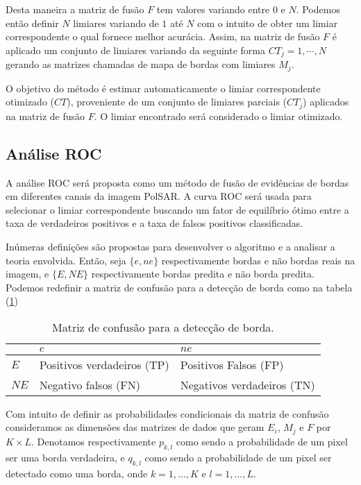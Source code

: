 Desta maneira a matriz de fusão $F$ tem valores variando entre $0$ e $N$. Podemos então definir $N$ limiares variando de $1$ até $N$ com o intuito de obter um limiar correspondente o qual fornece melhor acurácia. Assim, na matriz de fusão $F$ é aplicado um conjunto de limiares variando da seguinte forma  $CT_j=1,\cdots,N$ gerando as matrizes chamadas de mapa de bordas com limiares $M_j$.

O objetivo do método é estimar automaticamente o limiar correspondente otimizado ($CT$),  proveniente de um conjunto de limiares parciais ($CT_j$) aplicados na matriz de fusão $F$. O limiar encontrado será considerado o limiar otimizado.  

\subsection{Análise ROC}
	A análise ROC será proposta como um método de fusão de evidências de bordas em diferentes canais da imagem PolSAR. A curva ROC será usada para selecionar o limiar correspondente buscando um fator de equilíbrio ótimo entre a taxa de verdadeiros positivos e a taxa de falsos positivos classificadas.

 Inúmeras  definições são propostas para desenvolver o algoritmo e a analisar a teoria envolvida. Então, seja $\{e, ne\}$ respectivamente bordas e não bordas reais na imagem, e $\{E, NE\}$ respectivamente bordas predita e não borda predita. Podemos redefinir a matriz de confusão para a detecção de borda como na tabela (\ref{cap_fusao_tab02})
 
\begin{table}[hbt]
	\centering
	\caption{Matriz de confusão para a detecção de borda.}\label{cap_fusao_tab02}
\begin{tabular}{@{}lll@{}} \toprule
	     & $e$  & $ne$  \\ \midrule
	$E$  & Positivos verdadeiros (TP)& Positivos Falsos (FP)  \\ 
	$NE$ & Negativo falsos (FN)      & Negativos verdadeiros (TN)\\ \bottomrule  
\end{tabular}
\end{table}

Com intuito de definir as probabilidades condicionais da matriz de confusão consideramos as dimensões das matrizes de dados que geram $E_i$, $M_j$ e $F$ por $K\times L$. Denotamos respectivamente $p_{k,l}$ como sendo a probabilidade de um pixel ser uma borda verdadeira, e $q_{k,l}$ como sendo a probabilidade de um pixel ser detectado como uma borda, onde $k=1,\dots,K$ e $l=1,\dots,L$. 

